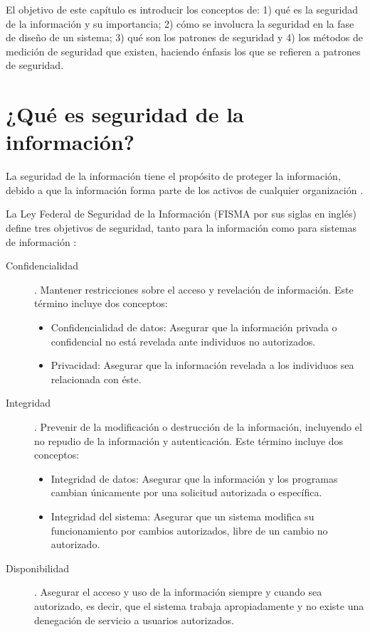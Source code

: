 

El objetivo de este capítulo es introducir los conceptos de: 1) qué es la seguridad de la información y su importancia; 2) cómo se involucra la seguridad en la fase de diseño de un sistema; 3) qué son los patrones de seguridad y 4) los métodos de medición de seguridad que existen, haciendo énfasis los que se refieren a patrones de seguridad.

\section{¿Qué es seguridad de la información?}\label{sec:segInfo}

La seguridad de la información tiene el propósito de proteger la información, debido a que la información forma parte de los activos de cualquier organización \cite{peltier2016information}.  

\vspace{0.3cm}

La Ley Federal de Seguridad de la Información (FISMA por sus siglas en inglés) define tres objetivos de seguridad, tanto para la información como para sistemas de información \cite{Sta11,StaTec0409}: 

\begin{description}
	\item [Confidencialidad]. Mantener restricciones sobre el acceso y revelación de información. Este término incluye dos conceptos:
		\begin{itemize}[noitemsep]
			\item Confidencialidad de datos: Asegurar que la información privada o confidencial no está revelada ante individuos no autorizados.
			\item Privacidad: Asegurar que la información revelada a los individuos sea relacionada con éste.
		\end{itemize} 
	
	\item [Integridad].  Prevenir de la modificación o destrucción de la información, incluyendo el no repudio de la información y autenticación. Este término incluye dos conceptos:
	\begin{itemize}[noitemsep]
			\item Integridad de datos: Asegurar que la información y los programas cambian únicamente por una solicitud autorizada o específica.
			\item Integridad del sistema: Asegurar que un sistema modifica su funcionamiento por cambios autorizados, libre de un cambio no autorizado.
		\end{itemize} 
	
	\item [Disponibilidad]. Asegurar el acceso y uso de la información siempre y cuando sea autorizado, es decir, que el sistema trabaja apropiadamente y no existe una denegación de servicio a usuarios autorizados. 
	
\end{description}


